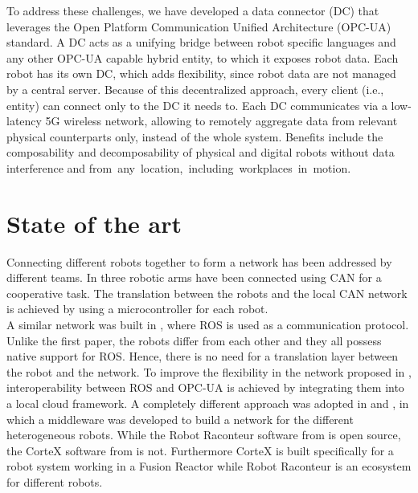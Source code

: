 \documentclass[conference]{IEEEtran}
\begin{document}
 
To address these challenges, we have developed a data connector (DC) that leverages the Open Platform Communication Unified Architecture (OPC-UA) standard.
A DC acts as a unifying bridge between robot specific languages and any other OPC-UA capable hybrid entity, to which it exposes robot data. Each robot has its own DC, which 
 adds flexibility, since  robot data are not managed by a central server.
Because of this decentralized approach, every client (i.e., entity) can connect only to the DC it needs to. Each DC  communicates via a low-latency 5G wireless network, allowing to remotely aggregate data  from   relevant physical counterparts only,  instead of the whole system. Benefits include the  composability and decomposability of physical and digital robots without data interference and \mbox{from any location, including workplaces in motion.} 
\section{State of the art}
Connecting  different robots together  to form a network has been addressed by different teams.
In \cite{SotaCAN} three robotic arms have been connected using CAN for a cooperative task.
The translation between the robots and the local CAN network is achieved by using a microcontroller for each robot.\\
A similar network was built in \cite{SotaROS}, where ROS is used as a communication protocol.
Unlike the first paper, the robots differ from each other and they all possess native support for ROS. Hence,  there is no need for a translation layer between the robot and the network. To improve the flexibility in  the network proposed in \cite{StoaROStoOPCUA},  interoperability between ROS and  OPC-UA is achieved by integrating them into a local cloud framework. A completely different approach was adopted in \cite{SotaRaconteur} and \cite{SotaFusion}, in which
a middleware was developed to build a network for the different heterogeneous robots.
While the Robot Raconteur software from \cite{SotaRaconteur} is open source, the CorteX software from \cite{SotaFusion} is not.
Furthermore CorteX is built specifically for a robot system working in a Fusion Reactor while Robot Raconteur is an ecosystem for different robots.
\end{document}
